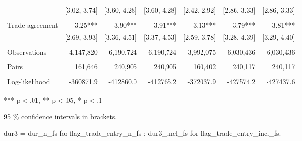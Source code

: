 \begin{table}[!h]
\begin{tabular}{lllllll}
\multicolumn{1}{l}{} &
  \multicolumn{1}{|r}{[3.02,    3.74]} &
  \multicolumn{1}{r}{[3.60,    4.28]} &
  \multicolumn{1}{r}{[3.60,    4.28]} &
  \multicolumn{1}{r}{[2.42,    2.92]} &
  \multicolumn{1}{r}{[2.86,    3.33]} &
  \multicolumn{1}{r}{[2.86,    3.33]} \\
\multicolumn{1}{l}{} &
  \multicolumn{1}{|r}{} &
  \multicolumn{1}{r}{} &
  \multicolumn{1}{r}{} &
  \multicolumn{1}{r}{} &
  \multicolumn{1}{r}{} &
  \multicolumn{1}{r}{} \\
\multicolumn{1}{l}{Trade agreement} &
  \multicolumn{1}{|r}{3.25***} &
  \multicolumn{1}{r}{3.90***} &
  \multicolumn{1}{r}{3.91***} &
  \multicolumn{1}{r}{3.13***} &
  \multicolumn{1}{r}{3.79***} &
  \multicolumn{1}{r}{3.81***} \\
\multicolumn{1}{l}{} &
  \multicolumn{1}{|r}{[2.69,    3.93]} &
  \multicolumn{1}{r}{[3.36,    4.51]} &
  \multicolumn{1}{r}{[3.37,    4.53]} &
  \multicolumn{1}{r}{[2.59,    3.78]} &
  \multicolumn{1}{r}{[3.28,    4.39]} &
  \multicolumn{1}{r}{[3.29,    4.40]} \\
\multicolumn{1}{l}{} &
  \multicolumn{1}{|r}{} &
  \multicolumn{1}{r}{} &
  \multicolumn{1}{r}{} &
  \multicolumn{1}{r}{} &
  \multicolumn{1}{r}{} &
  \multicolumn{1}{r}{} \\
\multicolumn{1}{l}{Observations} &
  \multicolumn{1}{|r}{4,147,820} &
  \multicolumn{1}{r}{6,190,724} &
  \multicolumn{1}{r}{6,190,724} &
  \multicolumn{1}{r}{3,992,075} &
  \multicolumn{1}{r}{6,030,436} &
  \multicolumn{1}{r}{6,030,436} \\
\multicolumn{1}{l}{} &
  \multicolumn{1}{|r}{} &
  \multicolumn{1}{r}{} &
  \multicolumn{1}{r}{} &
  \multicolumn{1}{r}{} &
  \multicolumn{1}{r}{} &
  \multicolumn{1}{r}{} \\
\multicolumn{1}{l}{Pairs} &
  \multicolumn{1}{|r}{161,646} &
  \multicolumn{1}{r}{240,905} &
  \multicolumn{1}{r}{240,905} &
  \multicolumn{1}{r}{160,402} &
  \multicolumn{1}{r}{240,117} &
  \multicolumn{1}{r}{240,117} \\
\multicolumn{1}{l}{} &
  \multicolumn{1}{|r}{} &
  \multicolumn{1}{r}{} &
  \multicolumn{1}{r}{} &
  \multicolumn{1}{r}{} &
  \multicolumn{1}{r}{} &
  \multicolumn{1}{r}{} \\
\multicolumn{1}{l}{Log-likelihood} &
  \multicolumn{1}{|r}{-360871.9} &
  \multicolumn{1}{r}{-412860.0} &
  \multicolumn{1}{r}{-412765.2} &
  \multicolumn{1}{r}{-372037.9} &
  \multicolumn{1}{r}{-427574.2} &
  \multicolumn{1}{r}{-427437.6} \\
\cline{1-7}
\end{tabular}

\footnotesize{
*** p$<$.01, ** p$<$.05, * p$<$.1

95 \% confidence intervals in brackets.

dur3 = dur\_n\_fs for flag\_trade\_entry\_n\_fs ; dur3\_incl\_fs for flag\_trade\_entry\_incl\_fs.
}
\end{table}
